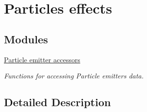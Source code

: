 \hypertarget{group____particles}{\section{Particles effects}
\label{group____particles}
}
\subsection*{Modules}
\begin{DoxyCompactItemize}
\item 
\hyperlink{group____accessors__particles}{Particle emitter accessors}
\begin{DoxyCompactList}\small\item\em Functions for accessing Particle emitters data. \end{DoxyCompactList}\end{DoxyCompactItemize}


\subsection{Detailed Description}
